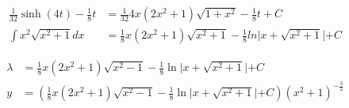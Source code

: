 \begin{align*}
	\frac{1}{32} \sinh(4t) - \frac{1}{8}t &= \frac{1}{32} 4x(2x^2 + 1)\sqrt{1 + x^2} - \frac{1}{8}t + C \\
	\int x^2 \sqrt{x^2 + 1} dx &= \frac{1}{8}x(2x^2 + 1)\sqrt{x^2+1} -\frac{1}{8} ln \lvert x + \sqrt{x^2 + 1} \lvert + C
\end{align*}

\begin{align*}
	\lambda &= \frac{1}{8}x(2x^2 +1)\sqrt{x^2-1} - \frac{1}{8} \ln \lvert x + \sqrt{x^2 + 1} \lvert + C \\
	y &= (\frac{1}{8}x(2x^2 +1)\sqrt{x^2-1} - \frac{1}{8} \ln \lvert x + \sqrt{x^2 + 1} \lvert + C)(x^2+1)^{-\frac{3}{2}}
\end{align*}


